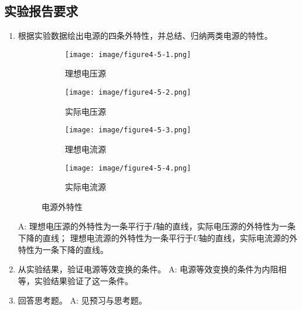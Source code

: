 \documentclass[UTF8]{article}
\begin{document}
        \subsection{实验报告要求}
            \begin{enumerate}[label=\textbf{\arabic*}.]
                \item 根据实验数据绘出电源的四条外特性，并总结、归纳两类电源的特性。
                \begin{figure}[H]
                    \centering
                    \begin{subfigure}[H]{0.45\textwidth}
                        \centering
                        \texttt{[image: image/figure4-5-1.png]}
                        \caption{理想电压源}
                    \end{subfigure}
                    \hfill
                    \begin{subfigure}[H]{0.45\textwidth}
                        \centering
                        \texttt{[image: image/figure4-5-2.png]}
                        \caption{实际电压源}
                    \end{subfigure}
                    \begin{subfigure}[H]{0.45\textwidth}
                        \centering
                        \texttt{[image: image/figure4-5-3.png]}
                        \caption{理想电流源}
                    \end{subfigure}
                    \hfill
                    \begin{subfigure}[H]{0.45\textwidth}
                        \centering
                        \texttt{[image: image/figure4-5-4.png]}
                        \caption{实际电流源}
                    \end{subfigure}
                    \caption{电源外特性}
                \end{figure}
                A: 理想电压源的外特性为一条平行于$I$轴的直线，实际电压源的外特性为一条下降的直线；
                理想电流源的外特性为一条平行于$U$轴的直线，实际电流源的外特性为一条下降的直线。
                \item 从实验结果，验证电源等效变换的条件。\newline
                A: 电源等效变换的条件为内阻相等，实验结果验证了这一条件。
                \item 回答思考题。\newline
                A: 见预习与思考题。
            \end{enumerate}
\end{document}
